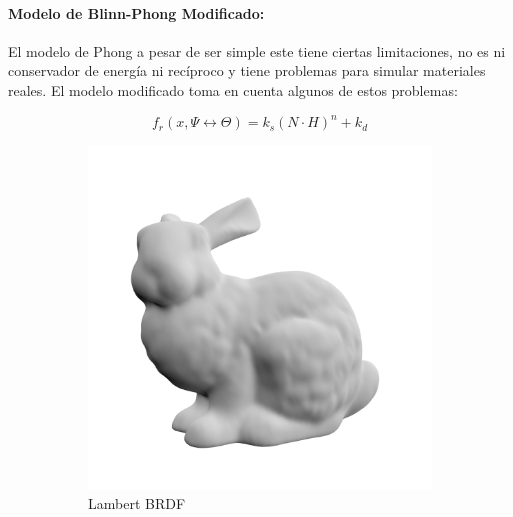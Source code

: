 \paragraph{Modelo de Blinn-Phong Modificado:}
\label{para:blinn_phong_mod}
El modelo de Phong a pesar de ser simple este tiene ciertas limitaciones, no es ni conservador de energía ni recíproco y tiene problemas para simular materiales reales. El modelo modificado toma en cuenta algunos de estos problemas:

\begin{equation}
    f_{r}(x, \Psi\leftrightarrow\Theta) = k_{s}(N\cdot H)^n + k_{d}
    \label{eq:blinn_phong}
\end{equation}

\begin{figure}[H]
	\centering
	\begin{subfigure}[t]{0.33\textwidth}
		\centering
		\captionsetup{justification=centering}
		\includegraphics[width=\linewidth]{media/diffuse_bunny.png}
		\caption*{Lambert \ac{BRDF}}
	\end{subfigure}%
	\begin{subfigure}[t]{0.33\textwidth}
		\centering
		\captionsetup{justification=centering}

\end{subfigure}
\end{figure}

